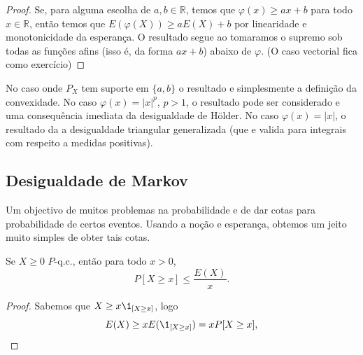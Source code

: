 \begin{proof}
  Se, para alguma escolha de $a, b \in \mathbb{R}$, temos que $\varphi(x) \geq a x + b$ para todo $x \in \mathbb{R}$, então temos que $E(\varphi(X)) \geq a E(X) + b$ por linearidade e monotonicidade da esperança.
  O resultado segue ao tomaramos o supremo sob todas as funções afins (isso é, da forma $a x + b$) abaixo de $\varphi$.
  (O caso vectorial fica como exercício)
\end{proof}

\begin{remark}
  No caso onde $P_X$ tem suporte em $\{a,b\}$ o resultado e simplesmente a definição da convexidade.
  No caso $\varphi(x)=|x|^p$, $p>1$, o resultado pode ser considerado e uma consequência imediata da desigualdade de H\"older.
  No caso $\varphi(x)=|x|$, o resultado da a desigualdade triangular generalizada (que e valida para integrais com respeito a medidas positivas).
\end{remark}

\subsection{Desigualdade de Markov}

Um objectivo de muitos problemas na probabilidade e de dar cotas para probabilidade de certos eventos.
Usando a noção e esperança, obtemos um jeito muito simples de obter tais cotas.

\begin{theorem}
  \label{t:markov}
  Se $X \geq 0$ $P$-q.c., então para todo $x > 0$,
  \begin{equation}
    P[X \geq x] \leq \frac{E(X)}{x}.
  \end{equation}
\end{theorem}

\begin{proof}
  Sabemos que $X \geq x \1_{[X \geq x]}$, logo
  \begin{equation}
    E(X) \geq x E(\1_{[X \geq x]}) = x P[X \geq x],
  \end{equation}
\end{proof}


